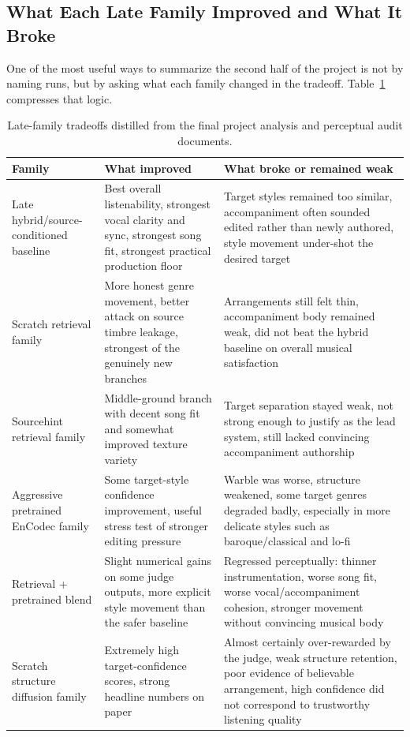 \documentclass[conference]{IEEEtran}
\begin{document}
\subsection{What Each Late Family Improved and What It Broke}
One of the most useful ways to summarize the second half of the project is not by naming runs, but by asking what each family changed in the tradeoff. Table~\ref{tab:familytradeoffs} compresses that logic.

\begin{table}[t]
\caption{Late-family tradeoffs distilled from the final project analysis and perceptual audit documents.}
\label{tab:familytradeoffs}
\centering
\small
\begin{tabular}{@{}p{3.2cm}p{5.5cm}p{6.0cm}@{}}
\toprule
\textbf{Family} & \textbf{What improved} & \textbf{What broke or remained weak} \\
\midrule
Late hybrid/source-conditioned baseline & Best overall listenability, strongest vocal clarity and sync, strongest song fit, strongest practical production floor & Target styles remained too similar, accompaniment often sounded edited rather than newly authored, style movement under-shot the desired target \\
\addlinespace
Scratch retrieval family & More honest genre movement, better attack on source timbre leakage, strongest of the genuinely new branches & Arrangements still felt thin, accompaniment body remained weak, did not beat the hybrid baseline on overall musical satisfaction \\
\addlinespace
Sourcehint retrieval family & Middle-ground branch with decent song fit and somewhat improved texture variety & Target separation stayed weak, not strong enough to justify as the lead system, still lacked convincing accompaniment authorship \\
\addlinespace
Aggressive pretrained EnCodec family & Some target-style confidence improvement, useful stress test of stronger editing pressure & Warble was worse, structure weakened, some target genres degraded badly, especially in more delicate styles such as baroque/classical and lo-fi \\
\addlinespace
Retrieval + pretrained blend & Slight numerical gains on some judge outputs, more explicit style movement than the safer baseline & Regressed perceptually: thinner instrumentation, worse song fit, worse vocal/accompaniment cohesion, stronger movement without convincing musical body \\
\addlinespace
Scratch structure diffusion family & Extremely high target-confidence scores, strong headline numbers on paper & Almost certainly over-rewarded by the judge, weak structure retention, poor evidence of believable arrangement, high confidence did not correspond to trustworthy listening quality \\
\bottomrule
\end{tabular}
\end{table}
\end{document}
